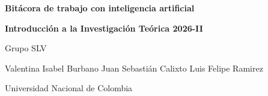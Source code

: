 \documentclass[11pt]{article}
\begin{document}
\begin{titlepage}
\centering
\vspace*{3cm}
{\LARGE\bfseries Bitácora de trabajo con inteligencia artificial\par}
\vspace{0.5cm}
{\large\bfseries Introducción a la Investigación Teórica 2026-II\par}
\vspace{1.5cm}
{\normalsize Grupo SLV\par}
{\normalsize Valentina Isabel Burbano \quad Juan Sebastián Calixto \quad Luis Felipe Ramirez\par}
\vfill
{\normalsize Universidad Nacional de Colombia\par}
\end{titlepage}

\tableofcontents
\clearpage


\clearpage

\end{document}
